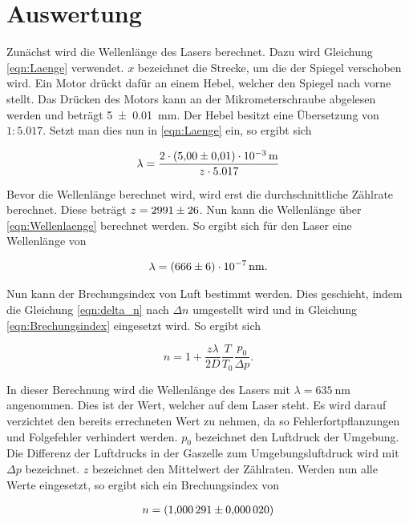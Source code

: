 


\section{Auswertung}
\label{sec:Auswertung}

Zunächst wird die Wellenlänge des Lasers berechnet. Dazu wird Gleichung \eqref{eqn:Laenge} verwendet. 
$x$ bezeichnet die Strecke, um die der Spiegel verschoben wird. Ein Motor drückt dafür an einem Hebel, 
welcher den Spiegel nach vorne stellt. Das Drücken des Motors kann an der Mikrometerschraube abgelesen 
werden und beträgt \qty{5\pm0.01}{\milli \meter}. Der Hebel besitzt eine Übersetzung von $1:5.017$. Setzt man 
dies nun in \eqref{eqn:Laenge} ein, so ergibt sich 

\begin{equation}
    \label{eqn:Wellenlaenge}
    \lambda = \frac{2 \cdot \qty{5\pm0.01e-3}{\meter} }{z \cdot 5.017}
\end{equation}

\noindent Bevor die Wellenlänge berechnet wird, wird erst die durchschnittliche Zählrate berechnet. Diese 
beträgt $z = \num{2991\pm26}$. Nun kann die Wellenlänge über \eqref{eqn:Wellenlaenge} berechnet werden. So 
ergibt sich für den Laser eine Wellenlänge von 

\begin{align}
    \lambda = \qty{666\pm6e-7}{\nano \meter}.
\end{align}

\noindent Nun kann der Brechungsindex von Luft bestimmt werden. Dies geschieht, indem die Gleichung \eqref{eqn:delta_n} 
nach $\Delta n$ umgestellt wird und in Gleichung \eqref{eqn:Brechungsindex} eingesetzt wird. So ergibt sich

\begin{equation*}
    n = 1 + \frac{z \lambda}{2 D} \frac{T}{T_0}\frac{p_0}{\Delta p}.
\end{equation*}

\noindent In dieser Berechnung wird die Wellenlänge des Lasers mit $\lambda = \qty{635}{\nano \meter}$ angenommen. 
Dies ist der Wert, welcher auf dem Laser steht. Es wird darauf verzichtet den bereits errechneten Wert zu 
nehmen, da so Fehlerfortpflanzungen und Folgefehler verhindert werden. $p_0$ bezeichnet den Luftdruck der Umgebung.
Die Differenz der Luftdrucks in der Gaszelle zum Umgebungsluftdruck wird mit $\Delta p$ bezeichnet. $z$ bezeichnet 
den Mittelwert der Zählraten. Werden nun alle Werte eingesetzt, so ergibt sich ein Brechungsindex von 

\begin{align}
    n = \qty{1.000291\pm0.000020}.
\end{align}





